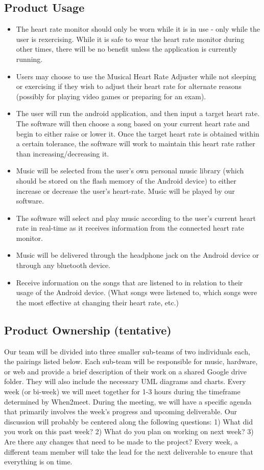 \documentclass[letterpaper,english, 12pt]{scrreprt}
\begin{document}
\subsection{Product Usage}
\begin{itemize}
	\item The heart rate monitor should only be worn while it is in use - only while the user is rexercising. While it is safe to wear the heart rate monitor during other times, there will be no benefit unless the application is currently running. 
	\item Users may choose to use the Musical Heart Rate Adjuster while not sleeping or exercising if they wish to adjust their heart rate for alternate reasons (possibly for playing video games or preparing for an exam). 
	\item The user will run the android application, and then input a target heart rate. The software will then choose a song based on your current heart rate and begin to either raise or lower it. Once the target heart rate is obtained within a certain tolerance, the software will work to maintain this heart rate rather than increasing/decreasing it.
	\item Music will be selected from the user's own personal music library (which should be stored on the flash memory of the Android device) to either increase or decrease the user's heart-rate. Music will be played by our software.
	\item The software will select and play music according to the user's current heart rate in real-time as it receives information from the connected heart rate monitor.
	\item Music will be delivered through the headphone jack on the Android device or through any bluetooth device.
	\item Receive information on the songs that are listened to in relation to their usage of the Android device. (What songs were listened to, which songs were the most effective at changing their heart rate, etc.)
\end{itemize}

\subsection{Product Ownership (tentative)}
Our team will be divided into three smaller sub-teams of two individuals each, the pairings listed below. Each sub-team will be responsible for music, hardware, or web and provide a brief description of their work on a shared Google drive folder. They will also include the necessary UML diagrams and charts. Every week (or bi-week) we will meet together for 1-3 hours during the timeframe determined by When2meet. During the meeting, we will have a specific agenda that primarily involves the week's progress and upcoming deliverable. Our discussion will probably be centered along the following questions: 1) What did you work on this past week? 2) What do you plan on working on next week? 3) Are there any changes that need to be made to the project? Every week, a different team member will take the lead for the next deliverable to ensure that everything is on time.          	
\end{document}
